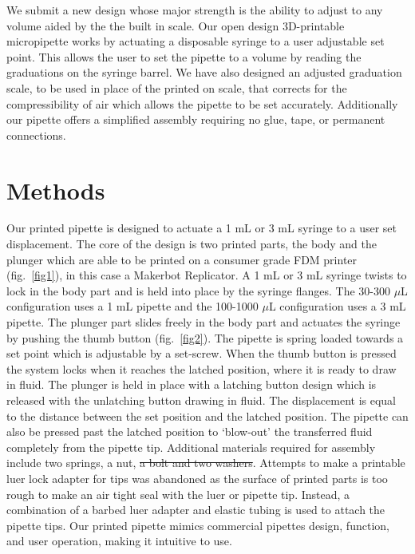 \documentclass[10pt,letterpaper]{article}
\providecommand{\DIFaddtex}[1]{{\protect\color{blue}\uwave{#1}}} %
\providecommand{\DIFdeltex}[1]{{\protect\color{red}\sout{#1}}}                      %
\providecommand{\DIFaddbegin}{} %
\providecommand{\DIFaddend}{} %
\providecommand{\DIFdelbegin}{} %
\providecommand{\DIFdelend}{} %
\providecommand{\DIFadd}[1]{\texorpdfstring{\DIFaddtex{#1}}{#1}} %
\providecommand{\DIFdel}[1]{\texorpdfstring{\DIFdeltex{#1}}{}} %
\begin{document}
We submit a new design whose major strength is the ability to adjust to any volume aided by the the built in scale.
Our open design 3D-printable micropipette works by actuating a disposable syringe to a user adjustable set point.
This allows the user to set the pipette to a volume by reading the graduations on the syringe barrel.
We have also designed an adjusted graduation scale, to be used in place of the printed on scale, that corrects for the compressibility of air which allows the pipette to be set accurately.
Additionally our pipette offers a simplified assembly requiring no glue, tape, or permanent connections.

\section*{Methods}
Our printed pipette is designed to actuate a 1 mL or 3 mL syringe to a user set displacement.
The core of the design is two printed parts, the body and the plunger which are able to be printed on a consumer grade FDM printer (fig.~\ref{fig1}), in this case a Makerbot Replicator.
A 1 mL or 3 mL syringe twists to lock in the body part and is held into place by the syringe flanges.
The 30-300 $\mu$L configuration uses a 1 mL pipette and the 100-1000 $\mu$L configuration uses a 3 mL pipette.
The plunger part slides freely in the body part and actuates the syringe by pushing the thumb button (fig.~\ref{fig2}). 
The pipette is spring loaded towards a set point which is adjustable by a set-screw.
When the thumb button is pressed the system locks when it reaches the latched position, where it is ready to draw in fluid.
The plunger is held in place with a latching button design which is released with the unlatching button drawing in fluid.
The displacement is equal to the distance between the set position and the latched position.
The pipette can also be pressed past the latched position to `blow-out' the transferred fluid completely from the pipette tip.
\DIFaddbegin \DIFadd{For a video on operation see } \DIFadd{and }\DIFadd{.  
}\DIFaddend Additional materials required for assembly include two springs, a nut, \DIFdelbegin \DIFdel{a bolt and two washers}\DIFdelend \DIFaddbegin \DIFadd{and a bolt}\DIFaddend .
Attempts to make a printable luer lock adapter for tips was abandoned as the surface of printed parts is too rough to make an air tight seal with the luer or pipette tip.
Instead, a combination of a barbed luer adapter and elastic tubing is used to attach the pipette tips.
Our printed pipette mimics commercial pipettes design, function, and user operation, making it intuitive to use.
\end{document}

